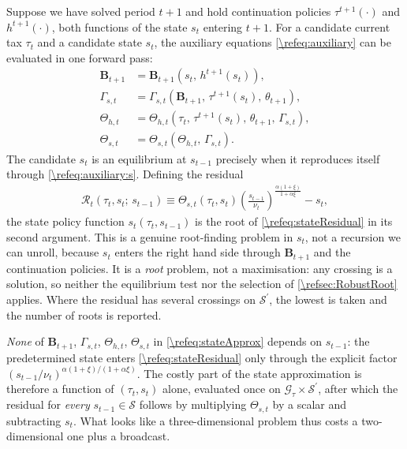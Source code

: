 Suppose we have solved period $t+1$ and hold continuation policies $\tau^{t+1}(\cdot)$ and $h^{t+1}(\cdot)$, both functions of the state $s_t$ entering $t+1$. For a candidate current tax $\tau_t$ and a candidate state $s_t$, the auxiliary equations \eqref{\refeq:auxiliary} can be evaluated in one forward pass:
\begin{subequations}\label{\refeq:stateApprox}
\begin{align}
    \bm{B}_{t+1} &= \bm{B}_{t+1}\left(s_t,\, h^{t+1}(s_t)\right), \label{\refeq:stateApprox:B}\\
    \Gamma_{s,t} &= \Gamma_{s,t}\left(\bm{B}_{t+1},\, \tau^{t+1}(s_t),\, \theta_{t+1}\right), \label{\refeq:stateApprox:Gammas}\\
    \Theta_{h,t} &= \Theta_{h,t}\left(\tau_t,\, \tau^{t+1}(s_t),\, \theta_{t+1},\, \Gamma_{s,t}\right), \label{\refeq:stateApprox:Thetah}\\
    \Theta_{s,t} &= \Theta_{s,t}\left(\Theta_{h,t},\, \Gamma_{s,t}\right). \label{\refeq:stateApprox:Thetas}
\end{align}
\end{subequations}
The candidate $s_t$ is an equilibrium at $s_{t-1}$ precisely when it reproduces itself through \eqref{\refeq:auxiliary:s}. Defining the residual
\begin{align}\label{\refeq:stateResidual}
    \mathcal{R}_t\left(\tau_t, s_t;\, s_{t-1}\right) \equiv \Theta_{s,t}\left(\tau_t, s_t\right)\left(\frac{s_{t-1}}{\nu_t}\right)^{\frac{\alpha(1+\xi)}{1+\alpha\xi}}-s_t,
\end{align}
the state policy function $s_t(\tau_t, s_{t-1})$ is the root of \eqref{\refeq:stateResidual} in its second argument. This is a genuine root-finding problem in $s_t$, not a recursion we can unroll, because $s_t$ enters the right hand side through $\bm{B}_{t+1}$ and the continuation policies. It is a \emph{root} problem, not a maximisation: any crossing is a solution, so neither the equilibrium test nor the selection of \cref{\refsec:RobustRoot} applies. Where the residual has several crossings on $\mathcal{S}^{\prime}$, the lowest is taken and the number of roots is reported.

\emph{None} of $\bm{B}_{t+1}$, $\Gamma_{s,t}$, $\Theta_{h,t}$, $\Theta_{s,t}$ in \eqref{\refeq:stateApprox} depends on $s_{t-1}$: the predetermined state enters \eqref{\refeq:stateResidual} only through the explicit factor $(s_{t-1}/\nu_t)^{\alpha(1+\xi)/(1+\alpha\xi)}$. The costly part of the state approximation is therefore a function of $(\tau_t, s_t)$ alone, evaluated once on $\mathcal{G}_{\tau}\times\mathcal{S}^{\prime}$, after which the residual for \emph{every} $s_{t-1}\in\mathcal{S}$ follows by multiplying $\Theta_{s,t}$ by a scalar and subtracting $s_t$. What looks like a three-dimensional problem thus costs a two-dimensional one plus a broadcast.

